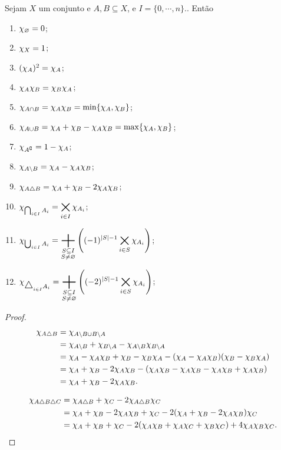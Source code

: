 \begin{prop}
Sejam $X$ um conjunto e $A,B \subseteq X$, e $I=\{0,\cdots,n\}.$. Então
	\begin{enumerate}
	\item $\chi_\varnothing=0$;
	\item $\chi_X=1$;
	\item $(\chi_A)^2=\chi_A$;
	\item $\chi_A\chi_B=\chi_B\chi_A$;
	\item $\chi_{A \cap B} = \chi_A\chi_B = \min\{\chi_A,\chi_B\}$;
	\item $\chi_{A \cup B} = \chi_A+\chi_B - \chi_A\chi_B = \max\{\chi_A,\chi_B\}$;
	\item $\chi_{A^\complement} = 1- \chi_A$;
	\item $\chi_{A \setminus B} = \chi_A-\chi_A\chi_B$;
	\item $\chi_{A \mathbin{\triangle} B} = \chi_A+\chi_B-2\chi_A\chi_B$;
	\item $\displaystyle\chi_{\bigcap_{i \in I} A_i} = \bigtimes_{i \in I} \chi_{A_i}$;
	\item $\displaystyle\idc_{\bigcup_{i \in I} A_i} = \bigplus_{\substack{S \subseteq I\\S \neq \emptyset}} \left((-1)^{\card{S}-1} \bigtimes_{i \in S}\idc_{A_i}\right)$;
	\item $\displaystyle\idc_{\scalebox{1.2}{$\difsim$}_{i \in I} A_i} = \bigplus_{\substack{S \subseteq I\\S \neq \emptyset}} \left((-2)^{\card{S}-1} \bigtimes_{i \in S}\idc_{A_i} \right)$;
	\end{enumerate}
\end{prop}
\begin{proof}
	\begin{align*}
	\chi_{A \mathbin{\triangle} B} &= \chi_{A\setminus B \cup B\setminus A} \\
			&= \chi_{A \setminus B} + \chi_{B \setminus A} - 	\chi_{A \setminus B}\chi_{B \setminus A}\\
			&=\chi_A-\chi_A\chi_B + \chi_B-\chi_B\chi_A - (\chi_A-\chi_A\chi_B)(\chi_B-\chi_B\chi_A)\\
			&=\chi_A+\chi_B-2\chi_A\chi_B-(\chi_A\chi_B-\chi_A\chi_B-\chi_A\chi_B+\chi_A\chi_B) \\
			&=\chi_A+\chi_B-2\chi_A\chi_B.
	\end{align*}
	
	\begin{align*}
	\chi_{A \mathbin{\triangle} B \mathbin{\triangle} C} &= \chi_{A \mathbin{\triangle} B}+\chi_C-2\chi_{A \mathbin{\triangle} B}\chi_C \\
			&= \chi_A+\chi_B-2\chi_A\chi_B+\chi_C-2(\chi_A+\chi_B-2\chi_A\chi_B)\chi_C \\
			&= \chi_A+\chi_B+\chi_C-2(\chi_A\chi_B+\chi_A\chi_C+\chi_B\chi_C)+4\chi_A\chi_B\chi_C.
	\end{align*}
\end{proof}

